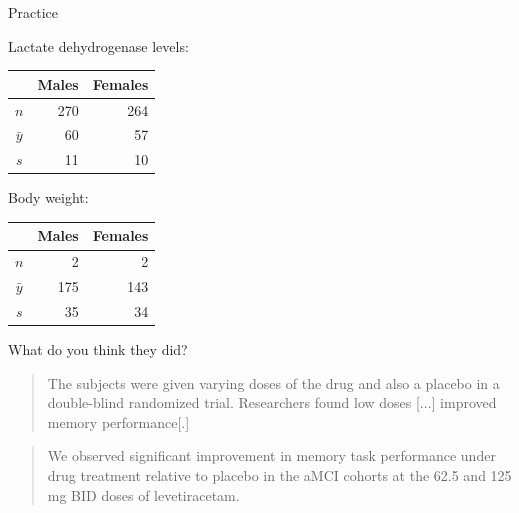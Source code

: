 \begin{frame}{Practice}

  Lactate dehydrogenase levels:
  \begin{center}
    \begin{tabular}{crr}
       & Males & Females \\
       \hline
       $n$ & 270 & 264 \\
       $\bar y$ & 60 & 57 \\
       $s$ & 11 & 10
     \end{tabular}

   \vspace{2em}

   \end{center}

   \vfill

  Body weight:
  \begin{center}
    \begin{tabular}{crr}
       & Males & Females \\
       \hline
       $n$ & 2 & 2 \\
       $\bar y$ & 175 & 143 \\
       $s$ & 35 & 34
     \end{tabular}

   \vspace{2em}

   \end{center}

\end{frame}


\begin{frame}{What do you think they did?}

    \begin{quote}
        The subjects were given varying doses of the drug and also a placebo in a double-blind randomized trial. Researchers found low doses [...] improved memory performance[.]
    \end{quote}

    \vfill
    \pause

    \begin{quote}
        We observed significant improvement in memory task performance under drug treatment relative to placebo in the aMCI cohorts at the 62.5 and 125 mg BID doses of levetiracetam.
    \end{quote}

\end{frame}



